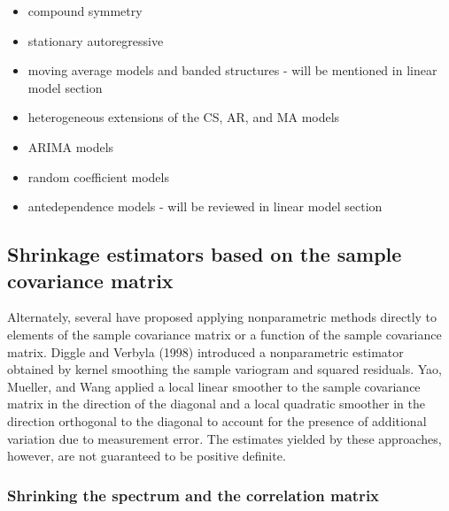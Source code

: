 \documentclass[12pt]{article}
\newcommand*\needsparaphrased{\color{red}}
\theoremstyle{definition}
\begin{document}
\begin{itemize}
\item compound symmetry
\item stationary autoregressive
\item moving average models and banded structures - will be mentioned in linear model section
\item heterogeneous extensions of the CS, AR, and MA models
\item ARIMA models
\item random coefficient models
\item antedependence models - will be reviewed in linear model section
\end{itemize}

\subsection{Shrinkage estimators based on the sample covariance matrix}


Alternately, several have proposed applying nonparametric methods directly to elements of the sample covariance matrix or a function of the sample covariance matrix. Diggle and Verbyla (1998) introduced a nonparametric estimator obtained by kernel smoothing the sample variogram and squared residuals.  Yao, Mueller, and Wang applied a local linear smoother to the sample covariance matrix in the direction of the diagonal and a local quadratic smoother in the direction orthogonal to the diagonal to account for the presence of additional variation due to measurement error.  {\needsparaphrased{[REVIEW 2009 WU AND POURAHMADI METHOD: banding the sample covariance matrix. Under the assumption of short range dependency, they show that their estimator converges to the true covariance matrix for a broad class of nonlinear processes.]} }The estimates yielded by these approaches, however, are not guaranteed to be positive definite. 


\subsubsection{Shrinking the spectrum and the correlation matrix}
\end{document}
